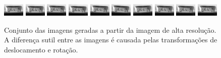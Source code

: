 \begin{figure}[H]
	\centering
	\caption{\label{fig:frames2}
	Conjunto das imagens geradas a partir da imagem de alta resolução. A diferença sutil entre as imagens é causada pelas transformações de deslocamento e rotação.}
	\includegraphics{figures/degradedImg2/result-0.png}
	\includegraphics{figures/degradedImg2/result-1.png}
	\includegraphics{figures/degradedImg2/result-2.png}
	\includegraphics{figures/degradedImg2/result-3.png}
	\includegraphics{figures/degradedImg2/result-4.png}
	\includegraphics{figures/degradedImg2/result-5.png}
	\includegraphics{figures/degradedImg2/result-6.png}
	\includegraphics{figures/degradedImg2/result-7.png}
	\includegraphics{figures/degradedImg2/result-8.png}
	\includegraphics{figures/degradedImg2/result-9.png} 


\end{figure}
